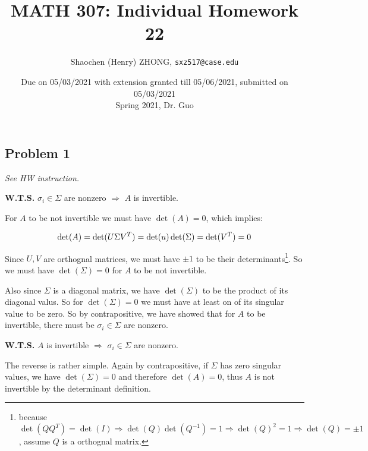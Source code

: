 \documentclass[11pt]{article}
\newcommand{\ilc}{\texttt}
\begin{document}
\title{\textbf{MATH 307: Individual Homework 22}}


\author{Shaochen (Henry) ZHONG, \ilc{sxz517@case.edu}}

\date{Due on 05/03/2021 with extension granted till 05/06/2021, submitted on 05/03/2021 \\ Spring 2021, Dr. Guo}
\maketitle



\subsection*{Problem 1}
\textit{See HW instruction.}\newline

\noindent\textbf{W.T.S.}  $\sigma_i \in \Sigma$ are nonzero $\Longrightarrow$ $A$ is invertible.

For $A$ to be not invertible we must have $\det(A) = 0$, which implies:

\begin{equation*}
    \det(A) = \det(U \Sigma V^T) = \det(u) \det(\Sigma) = \det(V^T) = 0 \\
\end{equation*}

Since $U, V$ are orthognal matrices, we must have $\pm 1$ to be their determinants\footnote{because $\det(Q Q^T) = \det(I) \Longrightarrow \det(Q) \det(Q^{-1}) = 1 \Longrightarrow \det(Q)^2  =  1 \Longrightarrow \det(Q) = \pm 1$, assume $Q$ is a orthognal matrix.}. So we must have $\det(\Sigma) = 0$ for $A$ to be not invertible.

Also since $\Sigma$ is a diagonal matrix, we have $\det(\Sigma)$ to be the product of its diagonal valus. So for $\det(\Sigma) = 0$ we must have at least on of its singular value to be zero. So by contrapositive, we have showed that for $A$ to be invertible, there must be  $\sigma_i \in \Sigma$ are nonzero.\newline

\noindent\textbf{W.T.S.} $A$ is invertible $\Longrightarrow$ $\sigma_i \in \Sigma$ are nonzero.

The reverse is rather simple. Again by contrapositive, if $\Sigma$ has zero singular values, we have $\det(\Sigma) = 0$ and therefore $\det(A) = 0$, thus $A$ is not invertible by the determinant definition.\newline
\end{document}
